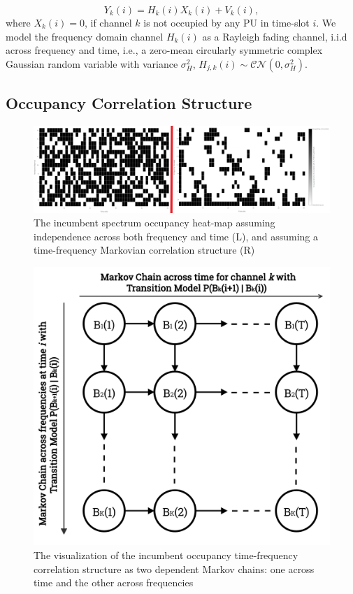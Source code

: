 \documentclass[12pt, draftcls, onecolumn]{IEEEtran}
\begin{document}
\begin{equation}\label{2}
    Y_{k}(i)=H_{k}(i)X_{k}(i)+V_{k}(i),
\end{equation}
where $X_{k}(i){=}0$, if channel $k$ is not occupied by any PU in time-slot $i$. We model the frequency domain channel $H_{k}(i)$ as a Rayleigh fading channel, i.i.d across frequency and time, i.e., a zero-mean circularly symmetric complex Gaussian random variable with variance $\sigma_{H}^{2}$, $H_{j,k}(i) \sim \mathcal{CN}(0,\sigma_{H}^{2})$.
\subsection{Occupancy Correlation Structure}\label{I.II}
\begin{figure} [htb]
    \centerline{
    \includegraphics[width = 1.0\linewidth]{figures/Minerva_Independent_Occupancy_Model.png}}
    \caption{The incumbent spectrum occupancy heat-map assuming independence across both frequency and time (L), and assuming a time-frequency Markovian correlation structure (R)}
    \label{fig:A.1}
\end{figure}
\begin{figure} [htb]
    \centerline{
    \includegraphics[width = 0.6\linewidth]{figures/Minerva_Occupancy_Markov_Chain_Flipped.png}}
    \caption{The visualization of the incumbent occupancy time-frequency correlation structure as two dependent Markov chains: one across time and the other across frequencies}
    \label{fig:A.3}
\end{figure}
\end{document}
